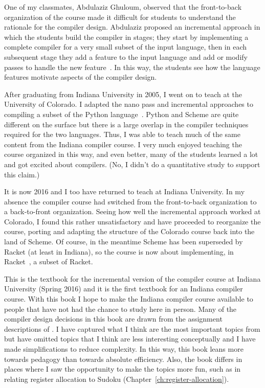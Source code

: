 \documentclass[11pt]{book}
\begin{document}
One of my classmates, Abdulaziz Ghuloum, observed that the
front-to-back organization of the course made it difficult for
students to understand the rationale for the compiler
design. Abdulaziz proposed an incremental approach in which the
students build the compiler in stages; they start by implementing a
complete compiler for a very small subset of the input language, then
in each subsequent stage they add a feature to the input language and
add or modify passes to handle the new feature~\citep{Ghuloum:2006bh}.
In this way, the students see how the language features motivate
aspects of the compiler design.

After graduating from Indiana University in 2005, I went on to teach
at the University of Colorado. I adapted the nano pass and incremental
approaches to compiling a subset of the Python
language~\citep{Siek:2012ab}.  Python and Scheme are quite different
on the surface but there is a large overlap in the compiler techniques
required for the two languages. Thus, I was able to teach much of the
same content from the Indiana compiler course. I very much enjoyed
teaching the course organized in this way, and even better, many of
the students learned a lot and got excited about compilers.  (No, I
didn't do a quantitative study to support this claim.)

It is now 2016 and I too have returned to teach at Indiana University.
In my absence the compiler course had switched from the front-to-back
organization to a back-to-front organization. Seeing how well the
incremental approach worked at Colorado, I found this rather
unsatisfactory and have proceeded to reorganize the course, porting
and adapting the structure of the Colorado course back into the land
of Scheme. Of course, in the meantime Scheme has been superseded by
Racket (at least in Indiana), so the course is now about implementing,
in Racket~\citep{plt-tr}, a subset of Racket.

This is the textbook for the incremental version of the compiler
course at Indiana University (Spring 2016) and it is the first
textbook for an Indiana compiler course.  With this book I hope to
make the Indiana compiler course available to people that have not had
the chance to study here in person.  Many of the compiler design
decisions in this book are drawn from the assignment descriptions of
\cite{Dybvig:2010aa}. I have captured what I think are the most
important topics from \cite{Dybvig:2010aa} but have omitted topics
that I think are less interesting conceptually and I have made
simplifications to reduce complexity.  In this way, this book leans
more towards pedagogy than towards absolute efficiency. Also, the book
differs in places where I saw the opportunity to make the topics more
fun, such as in relating register allocation to Sudoku
(Chapter~\ref{ch:register-allocation}).
\end{document}
